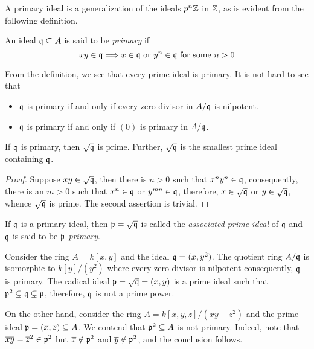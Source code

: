 A primary ideal is a generalization of the ideals $p^n\mathbb{Z}$ in $\mathbb{Z}$, as is evident from the following definition.

\begin{definition}
    An ideal $\mathfrak q\subseteq A$ is said to be \textit{primary} if 
    \begin{equation*}
        xy\in\mathfrak q\Longrightarrow x\in\mathfrak q\text{ or }y^n\in\mathfrak q\text{ for some } n > 0
    \end{equation*}
\end{definition}


From the definition, we see that every prime ideal is primary. It is not hard to see that
\begin{itemize}
\item $\mathfrak q$ is primary if and only if every zero divisor in $A/\mathfrak q$ is nilpotent. 
\item $\mathfrak q$ is primary if and only if $(0)$ is primary in $A/\mathfrak q$.
\end{itemize}


\begin{proposition}
    If $\mathfrak q$ is primary, then $\sqrt{\mathfrak q}$ is prime. Further, $\sqrt{\mathfrak q}$ is the smallest prime ideal containing $\mathfrak q$.
\end{proposition}
\begin{proof}
    Suppose $xy\in\sqrt{\mathfrak q}$, then there is $n > 0$ such that $x^ny^n\in\mathfrak q$, consequently, there is an $m > 0$ such that $x^n\in\mathfrak q$ or $y^{mn}\in\mathfrak q$, therefore, $x\in\sqrt{\mathfrak q}$ or $y\in\sqrt{\mathfrak q}$, whence $\sqrt{\mathfrak q}$ is prime. The second assertion is trivial.
\end{proof}

If $\mathfrak q$ is a primary ideal, then $\mathfrak p = \sqrt{\mathfrak q}$ is called the \textit{associated prime ideal} of $\mathfrak q$ and $\mathfrak q$ is said to be \textit{$\mathfrak p$-primary}.

Consider the ring $A = k[x,y]$ and the ideal $\mathfrak q = (x,y^2)$. The quotient ring $A/\mathfrak q$ is isomorphic to $k[y]/(y^2)$ where every zero divisor is nilpotent consequently, $\mathfrak q$ is primary. The radical ideal $\mathfrak p = \sqrt{\mathfrak q} = (x,y)$ is a prime ideal such that $\mathfrak p^2\subsetneq\mathfrak q\subsetneq\mathfrak p$, therefore, $\mathfrak q$ is not a prime power.

On the other hand, consider the ring $A = k[x,y,z]/(xy - z^2)$ and the prime ideal $\mathfrak p = (\overline x,\overline z)\subseteq A$. We contend that $\mathfrak p^2\subseteq A$ is not primary. Indeed, note that $\overline x\overline y = \overline z^2\in\mathfrak p^2$ but $\overline x\notin\mathfrak p^2$ and $\overline y\notin\mathfrak p^2$, and the conclusion follows.

